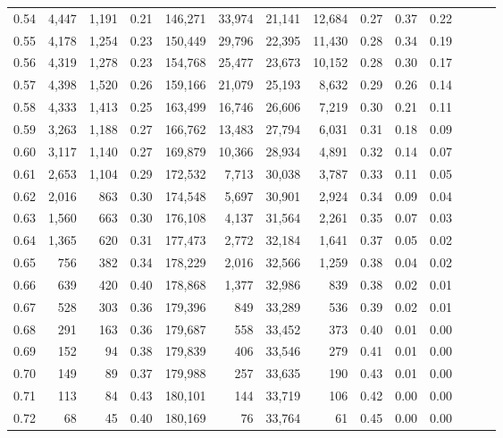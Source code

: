 \begin{tabular}{rrrrrrrrrrrrrr}
0.54 &  4,447 &  1,191 &  0.21 &  146,271 &   33,974 &  21,141 &  12,684 &  0.27 &  0.37 &      0.22 \\
0.55 &  4,178 &  1,254 &  0.23 &  150,449 &   29,796 &  22,395 &  11,430 &  0.28 &  0.34 &      0.19 \\
0.56 &  4,319 &  1,278 &  0.23 &  154,768 &   25,477 &  23,673 &  10,152 &  0.28 &  0.30 &      0.17 \\
0.57 &  4,398 &  1,520 &  0.26 &  159,166 &   21,079 &  25,193 &   8,632 &  0.29 &  0.26 &      0.14 \\
0.58 &  4,333 &  1,413 &  0.25 &  163,499 &   16,746 &  26,606 &   7,219 &  0.30 &  0.21 &      0.11 \\
0.59 &  3,263 &  1,188 &  0.27 &  166,762 &   13,483 &  27,794 &   6,031 &  0.31 &  0.18 &      0.09 \\
0.60 &  3,117 &  1,140 &  0.27 &  169,879 &   10,366 &  28,934 &   4,891 &  0.32 &  0.14 &      0.07 \\
0.61 &  2,653 &  1,104 &  0.29 &  172,532 &    7,713 &  30,038 &   3,787 &  0.33 &  0.11 &      0.05 \\
0.62 &  2,016 &    863 &  0.30 &  174,548 &    5,697 &  30,901 &   2,924 &  0.34 &  0.09 &      0.04 \\
0.63 &  1,560 &    663 &  0.30 &  176,108 &    4,137 &  31,564 &   2,261 &  0.35 &  0.07 &      0.03 \\
0.64 &  1,365 &    620 &  0.31 &  177,473 &    2,772 &  32,184 &   1,641 &  0.37 &  0.05 &      0.02 \\
0.65 &    756 &    382 &  0.34 &  178,229 &    2,016 &  32,566 &   1,259 &  0.38 &  0.04 &      0.02 \\
0.66 &    639 &    420 &  0.40 &  178,868 &    1,377 &  32,986 &     839 &  0.38 &  0.02 &      0.01 \\
0.67 &    528 &    303 &  0.36 &  179,396 &      849 &  33,289 &     536 &  0.39 &  0.02 &      0.01 \\
0.68 &    291 &    163 &  0.36 &  179,687 &      558 &  33,452 &     373 &  0.40 &  0.01 &      0.00 \\
0.69 &    152 &     94 &  0.38 &  179,839 &      406 &  33,546 &     279 &  0.41 &  0.01 &      0.00 \\
0.70 &    149 &     89 &  0.37 &  179,988 &      257 &  33,635 &     190 &  0.43 &  0.01 &      0.00 \\
0.71 &    113 &     84 &  0.43 &  180,101 &      144 &  33,719 &     106 &  0.42 &  0.00 &      0.00 \\
0.72 &     68 &     45 &  0.40 &  180,169 &       76 &  33,764 &      61 &  0.45 &  0.00 &      0.00 \\

\end{tabular}
